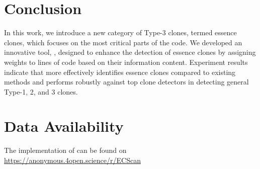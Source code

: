 \section{Conclusion}
In this work, we introduce a new category of Type-3 clones, termed essence clones, which focuses on the most critical parts of the code. We developed an innovative tool, \toolname, designed to enhance the detection of essence clones by assigning weights to lines of code based on their information content. Experiment results indicate that \toolname more effectively identifies essence clones compared to existing methods and performs robustly against top clone detectors in detecting general Type-1, 2, and 3 clones.

\section{Data Availability}
The implementation of \toolname can be found on \url{https://anonymous.4open.science/r/ECScan}
